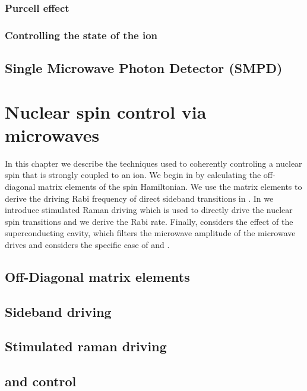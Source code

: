 \subsection{Purcell effect}



\subsection{Controlling the state of the \Er ion}

\section{Single Microwave Photon Detector (SMPD)}

\setchapterpreamble[u]{\margintoc}
\chapter{Nuclear spin control via microwaves}

In this chapter we describe the techniques used to coherently controling a nuclear spin that is strongly coupled to an \Er ion. We begin in  by calculating the off-diagonal matrix elements of the spin Hamiltonian. We use the matrix elements to derive the driving Rabi frequency of direct sideband transitions in . In  we introduce stimulated Raman driving which is used to directly drive the nuclear spin transitions and we derive the Rabi rate. Finally,  considers the effect of the superconducting cavity, which filters the microwave amplitude of the microwave drives and considers the specific case of \W and \Nb. 

\section{Off-Diagonal matrix elements}

\section{Sideband driving}

\section{Stimulated raman driving}

\section[183W and 93Nb control]{\W and \Nb control}
